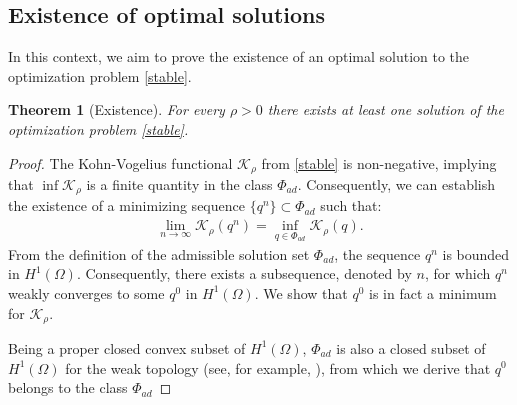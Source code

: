 \documentclass[a4paper,12pt,reqno,natbib]{amsart}
\newtheorem{theorem}{Theorem}
\begin{document}
\subsection{Existence of optimal solutions}

In this context, we aim to prove the existence of an optimal solution to the optimization problem \eqref{stable}.

\begin{theorem}[Existence]\label{theorem-existence}
For every $\rho>0$ there exists at least one solution of the optimization
problem \eqref{stable}.
\end{theorem}
\begin{proof}
The Kohn-Vogelius functional $\mathcal{K}_\rho$ from \eqref{stable} is non-negative, implying that $\displaystyle\inf\mathcal{K}_\rho$ is a finite quantity in the class $\Phi_{ad}.$ Consequently, we can establish the existence of a minimizing sequence $\{q^n\}\subset\Phi_{ad}$ such that:
\begin{align*}
\lim_{n\rightarrow\infty}\mathcal{K}_\rho(q^n)=\inf_{q\in\Phi_{ad}}\mathcal{K}_\rho(q).
\end{align*}
From the definition of the admissible solution set $\Phi_{ad}$, the sequence ${q^n}$ is bounded in $H^1(\Omega)$. Consequently, there exists a subsequence, denoted by $n$, for which $q^n$ weakly converges to some $q^0$ in $H^1(\Omega).$ We show that $q^0$ is in fact a minimum for $\mathcal{K}_\rho.$

Being a proper closed convex subset of $H^1(\Omega)$, $\Phi_{ad}$ is also a closed subset of $H^1(\Omega)$ for the weak topology (see, for example, \cite{brezis2010functional}), from which we derive that $q^0$ belongs to the class $\Phi_{ad}$


\end{proof}
\end{document}

